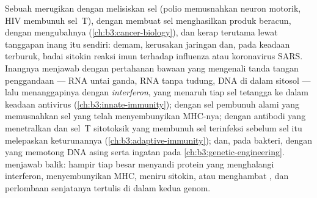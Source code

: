 \begin{proposition}\label{prop:b3:virology:pathogenesis}
Sebuah  merugikan dengan melisiskan sel (polio memusnahkan neuron motorik,
HIV membunuh sel~T), dengan membuat sel menghasilkan produk beracun, dengan
mengubahnya (\cref{ch:b3:cancer-biology}), dan kerap terutama lewat tanggapan
inang itu sendiri: demam, kerusakan jaringan dan, pada keadaan terburuk, badai
sitokin reaksi imun terhadap influenza atau koronavirus SARS. Inangnya
menjawab dengan pertahanan bawaan yang mengenali tanda tangan penggandaan
 --- RNA untai ganda, RNA tanpa tudung, DNA di dalam sitosol --- lalu
menanggapinya dengan \emph{interferon}, yang menaruh tiap sel tetangga ke dalam
keadaan antivirus (\cref{ch:b3:innate-immunity}); dengan sel pembunuh alami
yang memusnahkan sel yang telah menyembunyikan MHC-nya; dengan antibodi yang
menetralkan  dan sel~T sitotoksik yang membunuh sel terinfeksi sebelum
sel itu melepaskan keturunannya (\cref{ch:b3:adaptive-immunity});
dan, pada bakteri, dengan  yang memotong DNA asing serta ingatan
 pada \cref{ch:b3:genetic-engineering}.  menjawab balik: hampir tiap
 besar menyandi protein yang menghalangi interferon, menyembunyikan MHC,
meniru sitokin, atau menghambat , dan perlombaan senjatanya tertulis
di dalam kedua genom.
\end{proposition}

